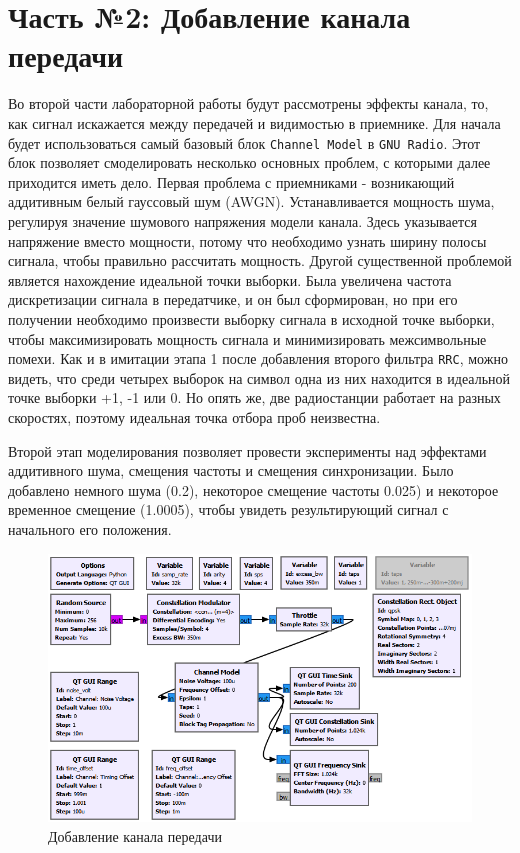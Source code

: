 \documentclass[a4paper]{article}
\begin{document}
    \newpage
        \section{Часть №2: Добавление канала передачи}
           Во второй части лабораторной работы будут рассмотрены эффекты канала, то, как сигнал искажается между передачей и видимостью в приемнике. Для начала будет использоваться самый базовый блок \texttt{Channel Model} в \texttt{GNU Radio}. Этот блок позволяет смоделировать несколько основных проблем, с которыми далее приходится иметь дело. Первая проблема с приемниками - возникающий аддитивным белый гауссовый шум (AWGN). Устанавливается мощность шума, регулируя значение шумового напряжения модели канала. Здесь указывается напряжение вместо мощности, потому что необходимо узнать ширину полосы сигнала, чтобы правильно рассчитать мощность. Другой существенной проблемой является нахождение идеальной точки выборки. Была увеличена частота дискретизации сигнала в передатчике, и он был сформирован, но при его получении необходимо произвести выборку сигнала в исходной точке выборки, чтобы максимизировать мощность сигнала и минимизировать межсимвольные помехи. Как и в имитации этапа 1 после добавления второго фильтра \texttt{RRC}, можно видеть, что среди четырех выборок на символ одна из них находится в идеальной точке выборки +1, -1 или 0. Но опять же, две радиостанции работает на разных скоростях, поэтому идеальная точка отбора проб неизвестна. 
           
           Второй этап моделирования позволяет провести эксперименты над эффектами аддитивного шума, смещения частоты и смещения синхронизации. Было добавлено немного шума (0.2), некоторое смещение частоты 0.025) и некоторое временное смещение (1.0005), чтобы увидеть результирующий сигнал с начального его положения.
           
           \begin{figure}[H]
                \centering
                \includegraphics[width=\textwidth]{ex_2_1.png}
                \caption{Добавление канала передачи}
                \label{fig:ex_2_1}
            \end{figure}
           
\end{document}

